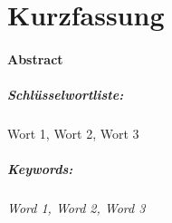 
\chapter*{Kurzfassung}
\thispagestyle{empty}
\blindtext
\vspace{2\baselineskip}

\subsubsection*{Abstract}
\textit{\blindtext@english}
\vspace{10\baselineskip}


\paragraph*{Schlüsselwortliste:}
Wort 1, Wort 2, Wort 3

\vspace{-1\baselineskip}

\paragraph*{Keywords:}
\textit{Word 1, Word 2, Word 3}
\clearpage
